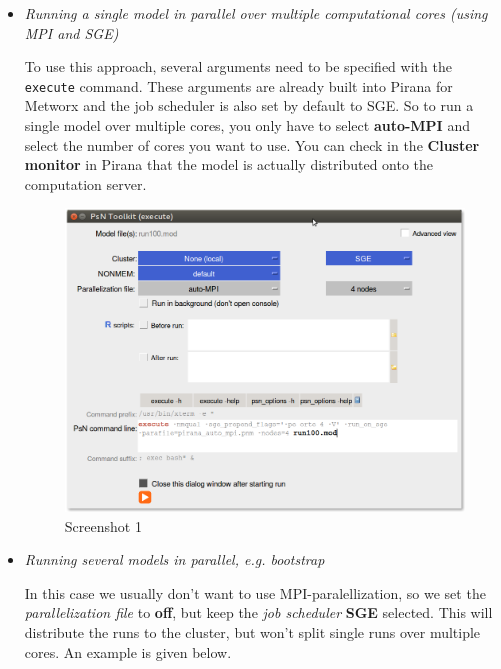 \documentclass[a4,11pt]{report}
\begin{document}
\begin{itemize}

\item{\textit{Running a single model in parallel over multiple
computational cores (using MPI and SGE)}}

To use this approach, several arguments need to be specified with the \texttt{execute}
command. These arguments are already built into Pirana for Metworx and
the job scheduler is also set by default to SGE. So to run a single
model over multiple cores, you only have to select \textbf{auto-MPI} and
select the number of cores you want to use. You can check in the
\textbf{Cluster monitor} in Pirana that the model is actually distributed onto the computation
server.

\begin{figure}[H]
\centering
\includegraphics[scale=0.25]{pirana1.png}
\caption{Screenshot 1}
\end{figure}

\item{\textit{Running several models in parallel, e.g. bootstrap}}

In this case we usually don't want to use MPI-paralellization, so we set the \textit{parallelization file} to \textbf{off},
but keep the \textit{job scheduler} \textbf{SGE} selected. This will distribute the runs to the cluster, but won't split single runs over multiple cores.
An example is given below.


\end{itemize}
\end{document}
